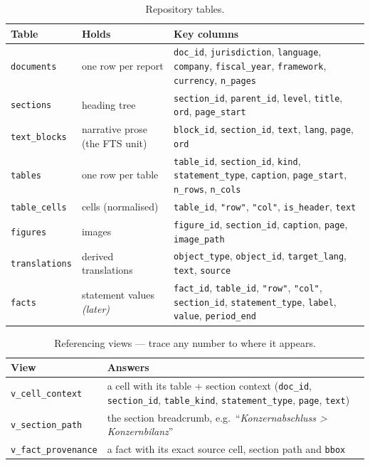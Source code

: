 \documentclass[11pt,a4paper]{report}
\begin{document}
\begin{table}[h]
\centering
\caption{Repository tables.}
\label{tab:repo-tables}
\small
\begin{tabular}{@{}p{}p{}p{}@{}}
\toprule
\textbf{Table} & \textbf{Holds} & \textbf{Key columns} \\
\midrule
\texttt{documents}   & one row per report   & \texttt{doc\_id}, \texttt{jurisdiction}, \texttt{language}, \texttt{company}, \texttt{fiscal\_year}, \texttt{framework}, \texttt{currency}, \texttt{n\_pages} \\
\texttt{sections}    & heading tree         & \texttt{section\_id}, \texttt{parent\_id}, \texttt{level}, \texttt{title}, \texttt{ord}, \texttt{page\_start} \\
\texttt{text\_blocks}& narrative prose (the FTS unit) & \texttt{block\_id}, \texttt{section\_id}, \texttt{text}, \texttt{lang}, \texttt{page}, \texttt{ord} \\
\texttt{tables}      & one row per table    & \texttt{table\_id}, \texttt{section\_id}, \texttt{kind}, \texttt{statement\_type}, \texttt{caption}, \texttt{page\_start}, \texttt{n\_rows}, \texttt{n\_cols} \\
\texttt{table\_cells}& cells (normalised)   & \texttt{table\_id}, \texttt{"row"}, \texttt{"col"}, \texttt{is\_header}, \texttt{text} \\
\texttt{figures}     & images               & \texttt{figure\_id}, \texttt{section\_id}, \texttt{caption}, \texttt{page}, \texttt{image\_path} \\
\texttt{translations}& derived translations & \texttt{object\_type}, \texttt{object\_id}, \texttt{target\_lang}, \texttt{text}, \texttt{source} \\
\texttt{facts}       & statement values \emph{(later)} & \texttt{fact\_id}, \texttt{table\_id}, \texttt{"row"}, \texttt{"col"}, \texttt{section\_id}, \texttt{statement\_type}, \texttt{label}, \texttt{value}, \texttt{period\_end} \\
\bottomrule
\end{tabular}
\end{table}

\begin{table}[h]
\centering
\caption{Referencing views --- trace any number to where it appears.}
\label{tab:repo-views}
\small
\begin{tabular}{@{}p{}p{}@{}}
\toprule
\textbf{View} & \textbf{Answers} \\
\midrule
\texttt{v\_cell\_context}    & a cell with its table + section context (\texttt{doc\_id}, \texttt{section\_id}, \texttt{table\_kind}, \texttt{statement\_type}, \texttt{page}, \texttt{text}) \\
\texttt{v\_section\_path}    & the section breadcrumb, e.g.\ ``\emph{Konzernabschluss > Konzernbilanz}'' \\
\texttt{v\_fact\_provenance} & a fact with its exact source cell, section path and \texttt{bbox} \\
\bottomrule
\end{tabular}
\end{table}
\end{document}

